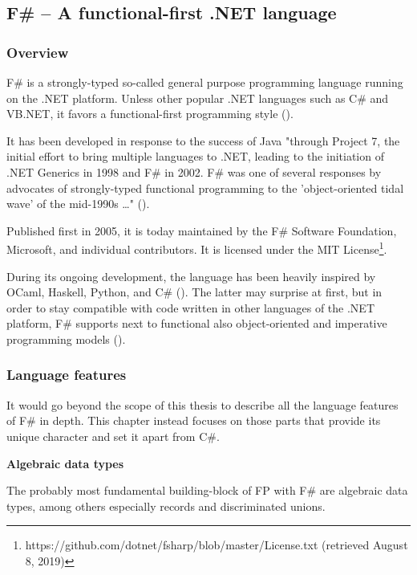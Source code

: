 \subsection{F\# – A functional-first .NET language}

\subsubsection{Overview}

F\# is a strongly-typed so-called general purpose programming language running on the .NET platform. Unless other popular .NET languages such as C\# and VB.NET, it favors a functional-first programming style (\cite{f_software_foundation_about_nodate}).

It has been developed in response to the success of Java "through Project 7, the initial effort to bring multiple languages to .NET, leading to the initiation of .NET Generics in 1998 and F\# in 2002. F\# was one of several responses by advocates of strongly-typed functional programming to the 'object-oriented tidal wave' of the mid-1990s \dots" (\cite{syme_early_2018}).

Published first in 2005, it is today maintained by the F\# Software Foundation, Microsoft, and individual contributors. It is licensed under the MIT License\footnote{https://github.com/dotnet/fsharp/blob/master/License.txt (retrieved August 8, 2019)}.

During its ongoing development, the language has been heavily inspired by OCaml, Haskell, Python, and C\# (\cite{syme_don_2010}). The latter may surprise at first, but in order to stay compatible with code written in other languages of the .NET platform, F\# supports next to functional also object-oriented and imperative programming models (\cite{microsoft_f_2016}).

\subsubsection{Language features}

It would go beyond the scope of this thesis to describe all the language features of F\# in depth. This chapter instead focuses on those parts that provide its unique character and set it apart from C\#.

\textbf{Algebraic data types}

The probably most fundamental building-block of FP with F\# are algebraic data types, among others especially records and discriminated unions.

